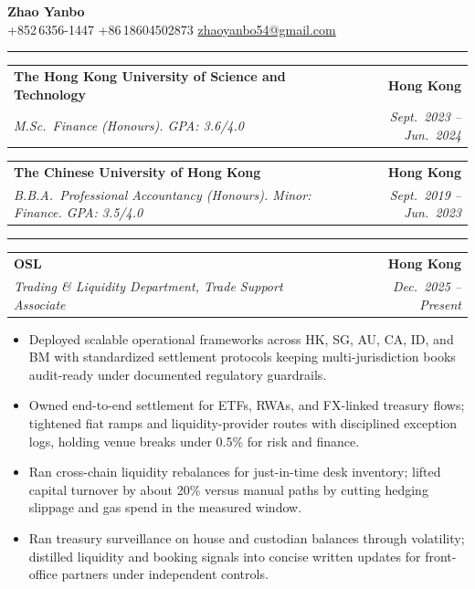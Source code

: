 \documentclass[9pt,a4paper]{extarticle}
\makeatletter
\newcommand{\ressection}[1]{%
  \vspace{0.8em}%
  \noindent{\large\scshape\bfseries #1}\par\nobreak
  \vspace{-\parskip}%
  \vspace{-\parskip}%
  \vspace{-\parskip}%
  \vspace{-\parskip}%
  \noindent\rule{\linewidth}{0.1pt}\par\nobreak
  \vspace{-\parskip}%
}
\newcommand{\resumeSubheading}[4]{%
  \vspace{0.6em}%
  \begin{tabular*}{\textwidth}{l@{\extracolsep{\fill}}r}
    \textbf{#1} & \textbf{#2} \\
    \textit{\small #3} & \textit{\small #4} \\
  \end{tabular*}\vspace{0.32em}}
\makeatother
\begin{document}
\begin{center}
  {\LARGE\bfseries Zhao Yanbo}\\[0.35em]
  \small
  +852\,6356-1447 \;\textbar\;
  +86\,18604502873 \;\textbar\;
  \href{mailto:zhaoyanbo54@gmail.com}{zhaoyanbo54@gmail.com}
\end{center}
\vspace{-0.2em}

\ressection{Education}

\resumeSubheading{The Hong Kong University of Science and Technology}{Hong Kong}{M.Sc.\ Finance (Honours). GPA: 3.6/4.0}{Sept.\ 2023 -- Jun.\ 2024}

\resumeSubheading{The Chinese University of Hong Kong}{Hong Kong}{B.B.A.\ Professional Accountancy (Honours). Minor: Finance. GPA: 3.5/4.0}{Sept.\ 2019 -- Jun.\ 2023}

\ressection{Work Experience}

\resumeSubheading{OSL}{Hong Kong}{Trading \& Liquidity Department, Trade Support Associate}{Dec.\ 2025 -- Present}
\begin{itemize}
  \item Deployed scalable operational frameworks across HK, SG, AU, CA, ID, and BM with standardized settlement protocols keeping multi-jurisdiction books audit-ready under documented regulatory guardrails.
  \item Owned end-to-end settlement for ETFs, RWAs, and FX-linked treasury flows; tightened fiat ramps and liquidity-provider routes with disciplined exception logs, holding venue breaks under 0.5\% for risk and finance.
  \item Ran cross-chain liquidity rebalances for just-in-time desk inventory; lifted capital turnover by about 20\% versus manual paths by cutting hedging slippage and gas spend in the measured window.
  \item Ran treasury surveillance on house and custodian balances through volatility; distilled liquidity and booking signals into concise written updates for front-office partners under independent controls.
\end{itemize}
\end{document}
